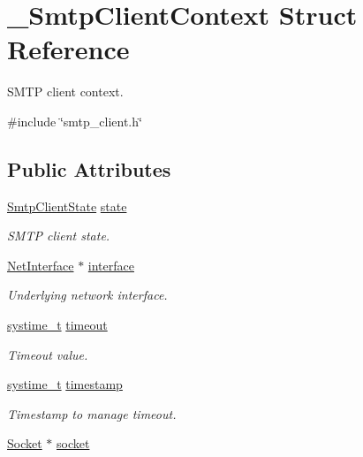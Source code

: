 \hypertarget{struct__SmtpClientContext}{}\section{\+\_\+\+Smtp\+Client\+Context Struct Reference}
\label{struct__SmtpClientContext}


S\+M\+TP client context.  




{\ttfamily \#include \char`\"{}smtp\+\_\+client.\+h\char`\"{}}

\subsection*{Public Attributes}
\begin{DoxyCompactItemize}
\item 
\hyperlink{smtp__client_8h_a02fc964f050527db806d949976661212}{Smtp\+Client\+State} \hyperlink{struct__SmtpClientContext_a7c137fa400a3ee3144d9c376dbb762ab}{state}
\begin{DoxyCompactList}\small\item\em S\+M\+TP client state. \end{DoxyCompactList}\item 
\hyperlink{net_8h_a2234db8911a1148c9159979d8f5e0d6b}{Net\+Interface} $\ast$ \hyperlink{struct__SmtpClientContext_acbc7a76809846d0c0c6bb6c15747f3f0}{interface}
\begin{DoxyCompactList}\small\item\em Underlying network interface. \end{DoxyCompactList}\item 
\hyperlink{compiler__port_8h_ae3e32a98d431a02106616da3071832dd}{systime\+\_\+t} \hyperlink{struct__SmtpClientContext_a99a21bfd307945df4944cb48bbc48539}{timeout}
\begin{DoxyCompactList}\small\item\em Timeout value. \end{DoxyCompactList}\item 
\hyperlink{compiler__port_8h_ae3e32a98d431a02106616da3071832dd}{systime\+\_\+t} \hyperlink{struct__SmtpClientContext_ae828b596e3e5e7bdacbfd8ebea198b5f}{timestamp}
\begin{DoxyCompactList}\small\item\em Timestamp to manage timeout. \end{DoxyCompactList}\item 
\hyperlink{socket_8h_aa85acfb0fa336ef495e6ba87fb88fc48}{Socket} $\ast$ \hyperlink{struct__SmtpClientContext_ae3a67578091bec03a60899d26eee5d29}{socket}

\end{DoxyCompactItemize}
